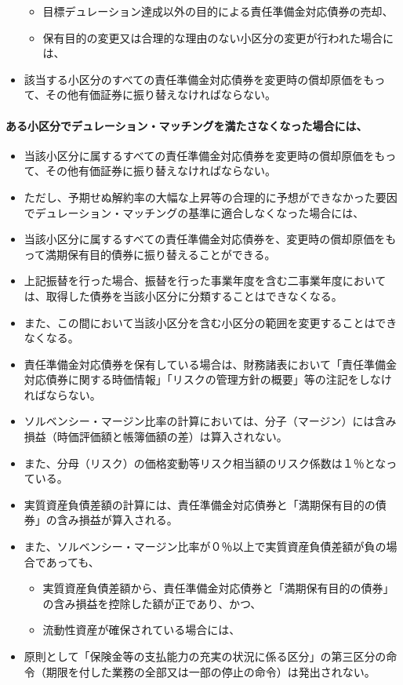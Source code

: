 \documentclass[report,gutter=10mm,fore-edge=10mm,uplatex,dvipdfmx]{jlreq}
\begin{document}
\begin{itemize}
  \begin{itemize}
  \tightlist
  \item
    目標デュレーション達成以外の目的による責任準備金対応債券の売却、
  \item
    保有目的の変更又は合理的な理由のない小区分の変更が行われた場合には、
  \end{itemize}
\item
  該当する小区分のすべての責任準備金対応債券を変更時の償却原価をもって、その他有価証券に振り替えなければならない。
\end{itemize}

\paragraph{ある小区分でデュレーション・マッチングを満たさなくなった場合には、}

\begin{itemize}
\tightlist
\item
  当該小区分に属するすべての責任準備金対応債券を変更時の償却原価をもって、その他有価証券に振り替えなければならない。
\item
  ただし、予期せぬ解約率の大幅な上昇等の合理的に予想ができなかった要因でデュレーション・マッチングの基準に適合しなくなった場合には、
\item
  当該小区分に属するすべての責任準備金対応債券を、変更時の償却原価をもって満期保有目的債券に振り替えることができる。
\item
  上記振替を行った場合、振替を行った事業年度を含む二事業年度においては、取得した債券を当該小区分に分類することはできなくなる。
\item
  また、この間において当該小区分を含む小区分の範囲を変更することはできなくなる。
\item
  責任準備金対応債券を保有している場合は、財務諸表において「責任準備金対応債券に関する時価情報」「リスクの管理方針の概要」等の注記をしなければならない。
\item
  ソルベンシー・マージン比率の計算においては、分子（マージン）には含み損益（時価評価額と帳簿価額の差）は算入されない。
\item
  また、分母（リスク）の価格変動等リスク相当額のリスク係数は１％となっている。
\item
  実質資産負債差額の計算には、責任準備金対応債券と「満期保有目的の債券」の含み損益が算入される。
\item
  また、ソルベンシー・マージン比率が０％以上で実質資産負債差額が負の場合であっても、

  \begin{itemize}
  \tightlist
  \item
    実質資産負債差額から、責任準備金対応債券と「満期保有目的の債券」の含み損益を控除した額が正であり、かつ、
  \item
    流動性資産が確保されている場合には、
  \end{itemize}
\item
  原則として「保険金等の支払能力の充実の状況に係る区分」の第三区分の命令（期限を付した業務の全部又は一部の停止の命令）は発出されない。
\end{itemize}
\end{document}
